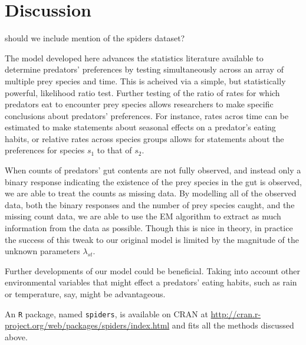 \section{Discussion}
\label{sec:discussion}

{\color{red} should we include mention of the spiders dataset?}

The model developed here advances the statistics literature available to determine predators' preferences by testing simultaneously across an array of multiple prey species and time.  This is acheived via a simple, but statistically powerful, likelihood ratio test.  Further testing of the ratio of rates for which predators eat to encounter prey species allows researchers to make specific conclusions about predators' preferences.  For instance, rates acros time can be estimated to make statements about seasonal effects on a predator's eating habits, or relative rates across species groups allows for statements about the preferences for species $s_1$ to that of $s_2$.  

When counts of predators' gut contents are not fully observed, and instead only a binary response indicating the existence of the prey species in the gut is observed, we are able to treat the counts as missing data.  By modelling all of the observed data, both the binary responses and the number of prey species caught, and the missing count data, we are able to use the EM algorithm to extract as much information from the data as possible.  Though this is nice in theory, in practice the success of this tweak to our original model is limited by the magnitude of the unknown parameters $\lambda_{st}$.  

Further developments of our model could be beneficial.  Taking into account other environmental variables that might effect a predators' eating habits, such as rain or temperature, say, might be advantageous.  

An \texttt{R} package, named \texttt{spiders}, is available on CRAN at \url{http://cran.r-project.org/web/packages/spiders/index.html} and fits all the methods discussed above.  

